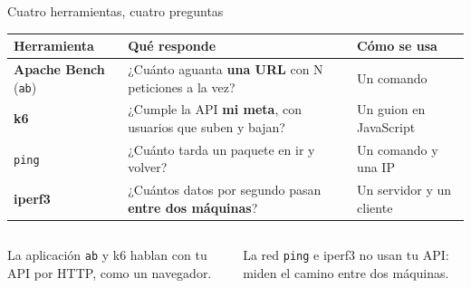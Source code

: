\documentclass[aspectratio=169,10pt,c]{beamer}
\begin{document}
\begin{frame}{Cuatro herramientas, cuatro preguntas}
\renewcommand{\arraystretch}{1.35}
\small
\begin{center}
\begin{tabular}{@{}>{\raggedright\arraybackslash}p{2.6cm}>{\raggedright\arraybackslash}p{5.0cm}>{\raggedright\arraybackslash}p{4.6cm}@{}}
\toprule
\textbf{Herramienta} & \textbf{Qué responde} & \textbf{Cómo se usa}\\
\midrule
\textbf{Apache Bench} (\texttt{ab}) & ¿Cuánto aguanta \textbf{una URL} con N peticiones a la vez? & Un comando\\
\textbf{k6} & ¿Cumple la API \textbf{mi meta}, con usuarios que suben y bajan? & Un guion en JavaScript\\
\texttt{ping} & ¿Cuánto tarda un paquete en ir y volver? & Un comando y una IP\\
\textbf{iperf3} & ¿Cuántos datos por segundo pasan \textbf{entre dos máquinas}? & Un servidor y un cliente\\
\bottomrule
\end{tabular}
\end{center}
\vspace{3mm}
\begin{columns}[T,onlytextwidth]
\begin{block}{La aplicación}
\small \texttt{ab} y k6 hablan con tu API por HTTP, como un navegador.
\end{block}
\begin{block}{La red}
\small \texttt{ping} e iperf3 no usan tu API: miden el camino entre dos máquinas.
\end{block}
\end{columns}
\end{frame}
\end{document}
